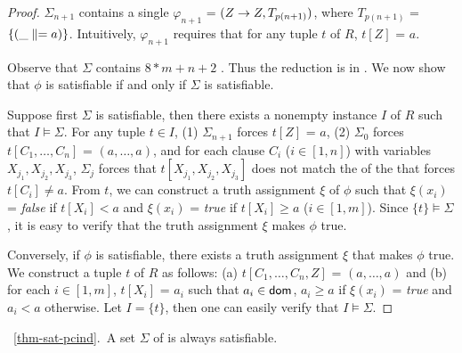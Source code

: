 \begin{proof}
\item $\Sigma_{n + 1}$ contains a single \pCFD $\varphi_{n+1}$ =
$(Z \rightarrow Z, T_{p(n+1)})$, where $T_{p(n+1)}$ = $\{(\_ \parallel = a)\}$.
Intuitively, $\varphi_{n+1}$ requires that for any tuple $t$ of $R$,
$t[Z]$ = $a$. \ei\vspace{-1.5ex}

Observe that $\Sigma$ contains $8*m + n + 2$ \pCFDs. Thus the
reduction is in \PTIME. We now show that $\phi$ is satisfiable if
and only if $\Sigma$ is satisfiable.

Suppose first $\Sigma$ is satisfiable, then there exists a nonempty
instance $I$ of $R$ such that $I\models\Sigma$. For any tuple $t\in
I$, (1) $\Sigma_{n+1}$ forces $t[Z]$ = $a$, (2) $\Sigma_0$ forces
$t[C_1, \ldots, C_n]$ = $(a, \ldots, a)$, and for each clause $C_i$
($i\in[1, n]$) with variables $X_{j_1},X_{j_2},X_{j_3}$, $\Sigma_j$
forces that $t[X_{j_1},X_{j_2},X_{j_3}]$  does not match the \LHS of
the \pCFD that forces $t[C_i]\ne a$. From $t$, we can construct a
truth assignment $\xi$ of $\phi$ such that $\xi(x_i)$ = {\em false}
if $t[X_i]< a$ and  $\xi(x_i)$ = {\em true} if $t[X_i]\ge a$
($i\in[1, m]$). Since $\{t\}\models\Sigma$, it is easy to verify
that the truth assignment $\xi$ makes $\phi$ true.

Conversely, if $\phi$ is satisfiable, there exists a truth
assignment $\xi$ that makes $\phi$ true. We construct a tuple $t$ of
$R$ as follows: (a) $t[C_1,\ldots, C_n, Z]$ = $(a, \ldots, a)$ and
(b) for each $i\in[1, m]$, $t[X_i]$ = $a_i$ such that $a_i\in\protect\mathsf{dom}$,
$a_i\ge a$ if $\xi(x_i)$ = {\em true} and $a_i< a$ otherwise. Let $I
= \{t\}$, then one can easily verify that $I\models\Sigma$. \eop
\end{proof}


\vspace{2ex} \noindent{}~\ref{thm-sat-pcind}.~A set
$\Sigma$ of \pCINDs is always satisfiable. \eop


